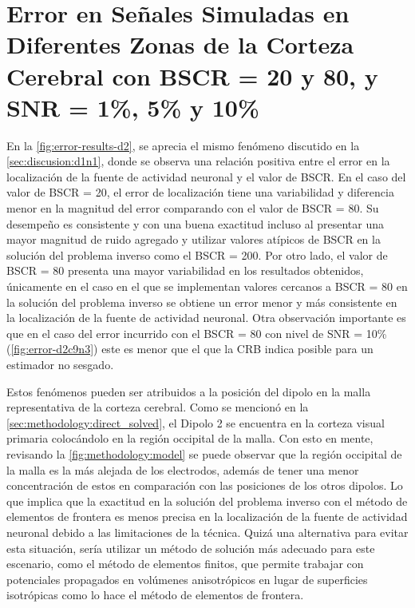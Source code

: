 \section{Error en Señales Simuladas en
Diferentes Zonas de la Corteza Cerebral con BSCR = 20 y 80, y SNR = 1\%, 5\% y 10\%}
\label{sec:discusion:d2n1}

En la \cref{fig:error-results-d2}, se aprecia el mismo fenómeno discutido en la \cref{sec:discusion:d1n1}, donde se observa una relación positiva entre el error en la localización de la fuente de actividad neuronal y el valor de BSCR.
En el caso del valor de BSCR = 20, el error de localización tiene una variabilidad y diferencia menor en la magnitud del error comparando con el valor de BSCR = 80.
Su desempeño es consistente y con una buena exactitud incluso al presentar una mayor magnitud de ruido agregado y utilizar valores atípicos de BSCR en la solución del problema inverso como el BSCR = 200.
Por otro lado, el valor de BSCR = 80 presenta una mayor variabilidad en los resultados obtenidos, únicamente en el caso en el que se implementan valores cercanos a BSCR = 80 en la solución del problema inverso se obtiene un error menor y más consistente en la localización de la fuente de actividad neuronal.
Otra observación importante es que en el caso del error incurrido con el BSCR = 80 con nivel de SNR = 10\% (\cref{fig:error-d2c9n3}) este es menor que el que la CRB indica posible para un estimador no sesgado.

Estos fenómenos pueden ser atribuidos a la posición del dipolo en la malla representativa de la corteza cerebral. 
Como se mencionó en la \cref{sec:methodology:direct_solved}, el Dipolo 2 se encuentra en la corteza visual primaria colocándolo en la región occipital de la malla.
Con esto en mente, revisando la \cref{fig:methodology:model} se puede observar que la región occipital de la malla es la más alejada de los electrodos, además de tener una menor concentración de estos en comparación con las posiciones de los otros dipolos. 
Lo que implica que la exactitud en la solución del problema inverso con el método de elementos de frontera es menos precisa en la localización de la fuente de actividad neuronal debido a las limitaciones de la técnica.
Quizá una alternativa para evitar esta situación, sería utilizar un método de solución más adecuado para este escenario, como el método de elementos finitos, que permite trabajar con potenciales propagados en volúmenes anisotrópicos en lugar de superficies isotrópicas como lo hace el método de elementos de frontera.

